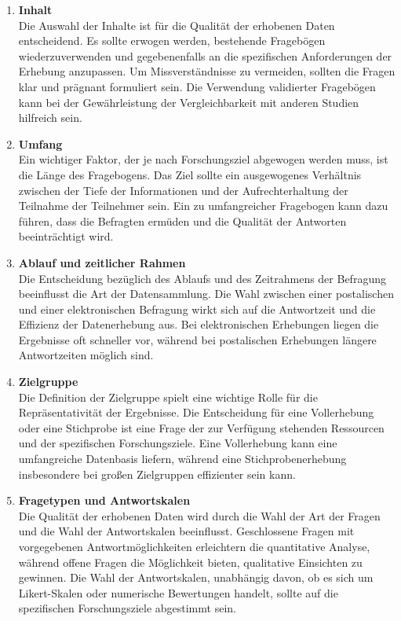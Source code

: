 \begin{enumerate}

    \item \textbf{Inhalt}\\
    Die Auswahl der Inhalte ist für die Qualität der erhobenen Daten entscheidend. Es sollte erwogen werden, bestehende
    Fragebögen wiederzuverwenden und gegebenenfalls an die spezifischen Anforderungen der Erhebung anzupassen. Um Missverständnisse
    zu vermeiden, sollten die Fragen klar und prägnant formuliert sein. Die Verwendung validierter Fragebögen kann bei der
    Gewährleistung der Vergleichbarkeit mit anderen Studien hilfreich sein.

    \item \textbf{Umfang}\\
    Ein wichtiger Faktor, der je nach Forschungsziel abgewogen werden muss, ist die Länge des Fragebogens. Das Ziel sollte
    ein ausgewogenes Verhältnis zwischen der Tiefe der Informationen und der Aufrechterhaltung der Teilnahme der Teilnehmer
    sein. Ein zu umfangreicher Fragebogen kann dazu führen, dass die Befragten ermüden und die Qualität der Antworten
    beeinträchtigt wird.

    \item \textbf{Ablauf und zeitlicher Rahmen}\\
    Die Entscheidung bezüglich des Ablaufs und des Zeitrahmens der Befragung beeinflusst die Art der Datensammlung. Die
    Wahl zwischen einer postalischen und einer elektronischen Befragung wirkt sich auf die Antwortzeit und die Effizienz
    der Datenerhebung aus. Bei elektronischen Erhebungen liegen die Ergebnisse oft schneller vor, während bei postalischen
    Erhebungen längere Antwortzeiten möglich sind.

    \item \textbf{Zielgruppe}\\
    Die Definition der Zielgruppe spielt eine wichtige Rolle für die Repräsentativität der Ergebnisse. Die Entscheidung
    für eine Vollerhebung oder eine Stichprobe ist eine Frage der zur Verfügung stehenden Ressourcen und der spezifischen
    Forschungsziele. Eine Vollerhebung kann eine umfangreiche Datenbasis liefern, während eine Stichprobenerhebung
    insbesondere bei großen Zielgruppen effizienter sein kann.

    \item \textbf{Fragetypen und Antwortskalen}\\
    Die Qualität der erhobenen Daten wird durch die Wahl der Art der Fragen und die Wahl der Antwortskalen beeinflusst.
    Geschlossene Fragen mit vorgegebenen Antwortmöglichkeiten erleichtern die quantitative Analyse, während offene Fragen
    die Möglichkeit bieten, qualitative Einsichten zu gewinnen. Die Wahl der Antwortskalen, unabhängig davon, ob es sich
    um Likert-Skalen oder numerische Bewertungen handelt, sollte auf die spezifischen Forschungsziele abgestimmt sein.


\end{enumerate}
